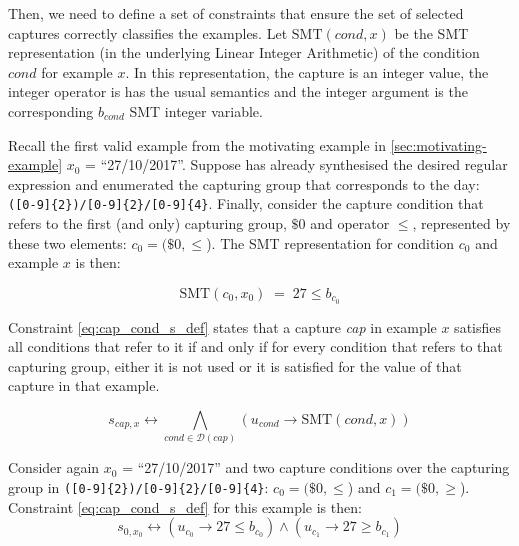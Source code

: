 Then, we need to define a set of constraints that ensure the set of selected captures correctly classifies the examples.
Let \(\textrm{SMT}(\textit{cond}, x)\) be the \ac{SMT} representation (in the underlying Linear Integer Arithmetic) of the condition \(\textit{cond}\) for example \(x\).
In this representation, the capture is an integer value, the integer operator is has the usual semantics and the integer argument is the corresponding \(b_{\textit{cond}}\) \ac{SMT} integer variable.

\begin{example}
Recall the first valid example from the motivating example in \autoref{sec:motivating-example} \(x_0\) = ``27/10/2017''.
%
Suppose \Forest has already synthesised the desired regular expression and enumerated the capturing group that corresponds to the day: \verb`([0-9]{2})/[0-9]{2}/[0-9]{4}`. 
%
Finally, consider the capture condition that refers to the first (and only) capturing group, \(\$0\) and operator \(\le\), represented by these two elements: \(c_0 = (\$0, \le\)).
%
The SMT representation for condition \(c_0\) and example \(x\) is then:

\[\textrm{SMT}(c_0, x_0)\; =\;  27 \le b_{c_0}\]
\end{example}

Constraint \ref{eq:cap_cond_s_def} states that a capture \textit{cap} in example \(x\) satisfies all conditions that refer to it if and only if for every condition that refers to that capturing group, either it is not used or it is satisfied for the value of that capture in that example.

\begin{equation}\label{eq:cap_cond_s_def}
    s_{cap,x} \leftrightarrow \bigwedge_{cond \in \mathcal{D}(cap)} (u_{cond} \rightarrow \textrm{SMT}(\textit{cond}, x))
\end{equation}

\begin{example}
Consider again \(x_0\) = ``27/10/2017'' and two capture conditions over the capturing group in \verb`([0-9]{2})/[0-9]{2}/[0-9]{4}`: \(c_0 = (\$0, \le\)) and \(c_1 = (\$0, \ge\)). Constraint \eqref{eq:cap_cond_s_def} for this example is then:
%
\begin{equation*}
    s_{0,x_0} \leftrightarrow (u_{c_0} \rightarrow 27 \le b_{c_0}) 
    \land (u_{c_1} \rightarrow 27 \ge b_{c_1})
\end{equation*}

\end{example}

